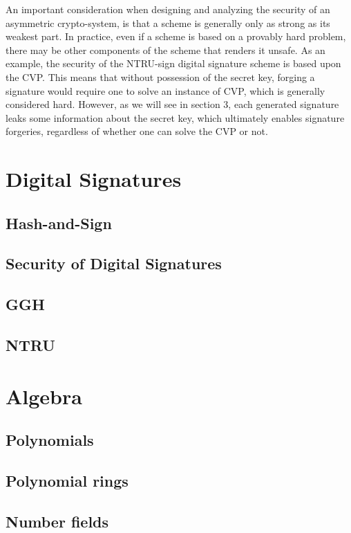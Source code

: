 An important consideration when designing and analyzing the security of an asymmetric crypto-system, is that a scheme is generally only as strong as its weakest part. 
In practice, even if a scheme is based on a provably hard problem, there may be other components of the scheme that renders it unsafe.
As an example, the security of the NTRU-sign digital signature scheme is based upon the CVP. 
This means that without possession of the secret key, forging a signature would require one to solve an instance of CVP, which is generally considered hard. 
However, as we will see in section 3, each generated signature leaks some information about the secret key, which ultimately enables signature forgeries, regardless of whether one can 
solve the CVP or not. 

\section{Digital Signatures}
\subsection{Hash-and-Sign}
\subsection{Security of Digital Signatures}
\subsection{GGH}
\subsection{NTRU}

\section{Algebra}
\subsection{Polynomials}
\subsection{Polynomial rings}
\subsection{Number fields}

